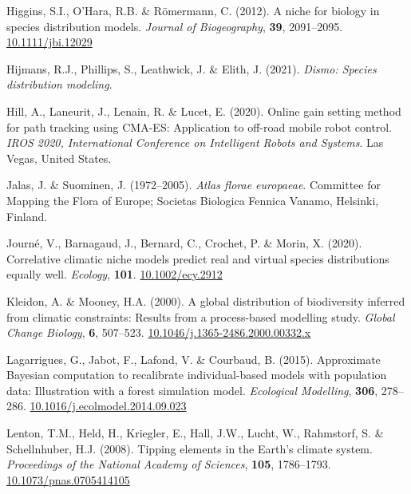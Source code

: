 \documentclass[11pt,]{article}
\newlength{\cslhangindent}
\newenvironment{CSLReferences}[2] %
 {%
  \setlength{\parindent}{0pt}
  \ifodd #1 \everypar{\setlength{\hangindent}{\cslhangindent}}\ignorespaces\fi
  \ifnum #2 > 0
  \setlength{\parskip}{#2\baselineskip}
  \fi
 }%
 {}
\begin{document}
\begin{CSLReferences}{1}{0}
\leavevmode{}%
Higgins, S.I., O'Hara, R.B. \& Römermann, C. (2012). A niche for biology
in species distribution models. \emph{Journal of Biogeography},
\textbf{39}, 2091--2095.
\href{https://doi.org/10.1111/jbi.12029}{10.1111/jbi.12029}

\leavevmode{}%
Hijmans, R.J., Phillips, S., Leathwick, J. \& Elith, J. (2021).
\emph{Dismo: Species distribution modeling}.

\leavevmode{}%
Hill, A., Laneurit, J., Lenain, R. \& Lucet, E. (2020). {Online gain
setting method for path tracking using CMA-ES: Application to off-road
mobile robot control}. \emph{{IROS 2020, International Conference on
Intelligent Robots and Systems}}. Las Vegas, United States.

\leavevmode{}%
Jalas, J. \& Suominen, J. (1972--2005). \emph{Atlas florae europaeae}.
Committee for Mapping the Flora of Europe; Societas Biologica Fennica
Vanamo, Helsinki, Finland.

\leavevmode{}%
Journé, V., Barnagaud, J., Bernard, C., Crochet, P. \& Morin, X. (2020).
Correlative climatic niche models predict real and virtual species
distributions equally well. \emph{Ecology}, \textbf{101}.
\href{https://doi.org/10.1002/ecy.2912}{10.1002/ecy.2912}

\leavevmode{}%
Kleidon, A. \& Mooney, H.A. (2000). A global distribution of
biodiversity inferred from climatic constraints: Results from a
process-based modelling study. \emph{Global Change Biology}, \textbf{6},
507--523.
\href{https://doi.org/10.1046/j.1365-2486.2000.00332.x}{10.1046/j.1365-2486.2000.00332.x}

\leavevmode{}%
Lagarrigues, G., Jabot, F., Lafond, V. \& Courbaud, B. (2015).
Approximate {Bayesian} computation to recalibrate individual-based
models with population data: {Illustration} with a forest simulation
model. \emph{Ecological Modelling}, \textbf{306}, 278--286.
\href{https://doi.org/10.1016/j.ecolmodel.2014.09.023}{10.1016/j.ecolmodel.2014.09.023}

\leavevmode{}%
Lenton, T.M., Held, H., Kriegler, E., Hall, J.W., Lucht, W., Rahmstorf,
S. \& Schellnhuber, H.J. (2008). Tipping elements in the {Earth}'s
climate system. \emph{Proceedings of the National Academy of Sciences},
\textbf{105}, 1786--1793.
\href{https://doi.org/10.1073/pnas.0705414105}{10.1073/pnas.0705414105}


\end{CSLReferences}
\end{document}
